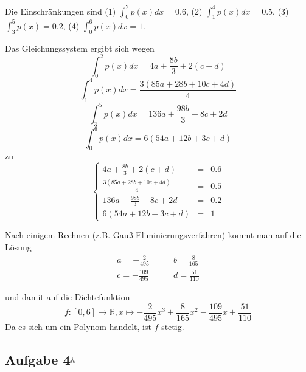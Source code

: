 \documentclass[11pt,a4paper,ngerman]{article}
\newcommand{\maxw}{$^\curlywedgedownarrow$}
\begin{document}
Die Einschränkungen sind (1) $\int_0^2 p(x) dx = 0.6$, (2) $\int_1^4 p(x) dx = 0.5$, (3) $\int_3^5 p(x) = 0.2$, (4) $\int_0^6 p(x) dx = 1$.

Das Gleichungssystem ergibt sich wegen
\begin{equation}
\int_0^2 p(x) dx = 4 a + \frac{8b}{3} + 2 (c + d)
\end{equation}
\begin{equation}
\int_1^4 p(x) dx =\frac{3 (85 a + 28 b + 10 c + 4 d)}{4}
\end{equation}
\begin{equation}
\int_3^5 p(x) dx =136 a + \frac{98 b}{3} + 8 c + 2 d
\end{equation}
\begin{equation}
\int_0^6 p(x) dx =6 (54 a + 12 b + 3 c + d)
\end{equation}
zu
\begin{equation*}
\left\{
\begin{array}{rcl}
 4 a + \frac{8b}{3} + 2 (c + d) & = & 0.6 \\
\frac{3 (85 a + 28 b + 10 c + 4 d)}{4} & = & 0.5 \\
136 a + \frac{98 b}{3} + 8 c + 2 d &= & 0.2 \\
6 (54 a + 12 b + 3 c + d) &=& 1
\end{array}
\right.
\end{equation*}

Nach einigem Rechnen (z.B. Gauß-Eliminierungsverfahren) kommt man auf die Lösung\\
\begin{equation*}\begin{split}
a = -\frac{2}{495} & \qquad b = \frac{8}{165} \\
c = -\frac{109}{495} & \qquad d = \frac{51}{110}
\end{split}\end{equation*}

und damit auf die Dichtefunktion 
\begin{equation*}
f: [0,6] \to \mathbb{R}, x \mapsto  -\frac{2}{495} x^3 +  \frac{8}{165} x^2 - \frac{109}{495}x +  \frac{51}{110}
\end{equation*}
Da es sich um ein Polynom handelt, ist $f$ stetig.
\subsection*{Aufgabe 4\maxw}
\end{document}
